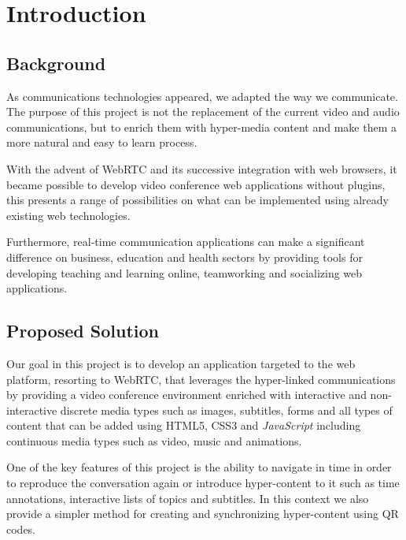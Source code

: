 \documentclass[conference,compsoc,a4paper]{IEEEtran}
\begin{document}
\IEEEpeerreviewmaketitle

\section{Introduction}
\label{chapter:introduction}

\subsection{Background}
\label{section:background}

	As communications technologies appeared, we adapted the way we communicate. The purpose of this project is not the replacement of the current video and audio communications, but to enrich them with hyper-media content and make them a more natural and easy to learn process. 

	With the advent of WebRTC and its successive integration with web browsers, it became possible to develop video conference web applications without plugins, this presents a range of possibilities on what can be implemented using already existing web technologies.
		
    Furthermore, real-time communication applications can make a significant difference on business, education and health sectors by providing tools for developing teaching and learning online, teamworking and socializing web applications.

\subsection{Proposed Solution}
\label{section:proposed}

	Our goal in this project is to develop an application targeted to the web platform, resorting to \gls{WebRTC}, that leverages the hyper-linked communications by providing a video conference environment enriched with interactive and non-interactive discrete media types such as images, subtitles, forms and all types of content that can be added using \gls{HTML}5, \gls{CSS}3 and \emph{JavaScript} including continuous media types such as video, music and animations.

	One of the key features of this project is the ability to navigate in time in order to reproduce the conversation again or introduce hyper-content to it such as time annotations, interactive lists of topics and subtitles. In this context we also provide a simpler method for creating and synchronizing hyper-content using \gls{QR} codes.
\end{document}
